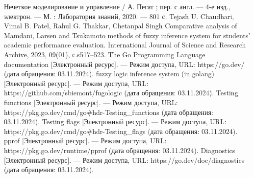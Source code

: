 \begin{thebibliography}{}
	 Нечеткое моделирование и управление / А. Пегат ;
	пер. с англ. — 4-е изд., электрон. — М. : Лаборатория знаний,
	2020. — 801 с.
	 Tejash U. Chaudhari, Vimal B. Patel, Rahul G. Thakkar, Chetanpal Singh Comparative analysis of Mamdani, Larsen and Tsukamoto methods of fuzzy inference
	system for students’ academic performance evaluation. International Journal of Science and Research Archive, 2023, 09(01), с.s517–523.
	 The Go Programming Language documentation [Электронный ресурс]. — Режим доступа, URL: https://go.dev/ (дата обращения: 03.11.2024).
	 fuzzy logic inference system (in golang) [Электронный ресурс]. — Режим доступа, URL: https://github.com/sbiemont/fugologic (дата обращения: 03.11.2024).
	 Testing functions [Электронный ресурс]. — Режим доступа, URL: https://pkg.go.dev/cmd/go\#hdr-Testing\_functions (дата обращения: 03.11.2024).
	 Testing flags [Электронный ресурс]. — Режим доступа, URL: https://pkg.go.dev/cmd/go\#hdr-Testing\_flags (дата обращения: 03.11.2024).
	 pprof [Электронный ресурс]. — Режим доступа, URL: https://pkg.go.dev/runtime/pprof (дата обращения: 03.11.2024).
	 Diagnostics [Электронный ресурс]. — Режим доступа, URL: https://go.dev/doc/diagnostics (дата обращения: 03.11.2024).
\end{thebibliography}
